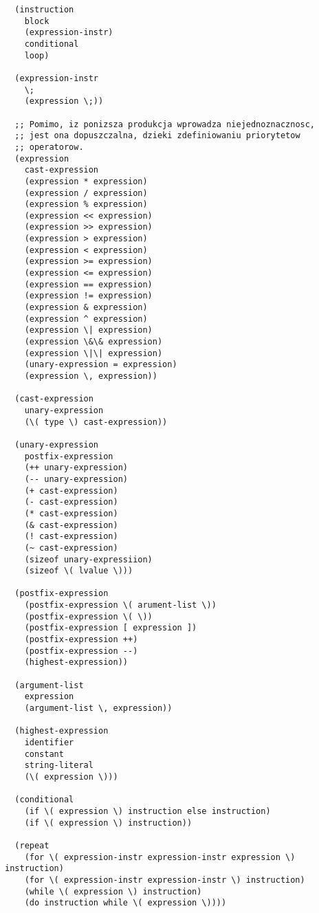\documentclass[11pt,a4paper]{article}
\begin{document}
\begin{lstlisting}
  (instruction
    block
    (expression-instr)
    conditional
    loop)
  
  (expression-instr
    \;
    (expression \;))
  
  ;; Pomimo, iz ponizsza produkcja wprowadza niejednoznacznosc,
  ;; jest ona dopuszczalna, dzieki zdefiniowaniu priorytetow
  ;; operatorow.
  (expression
    cast-expression
    (expression * expression)
    (expression / expression)
    (expression % expression)
    (expression << expression)
    (expression >> expression)
    (expression > expression)
    (expression < expression)
    (expression >= expression)
    (expression <= expression)
    (expression == expression)
    (expression != expression)
    (expression & expression)
    (expression ^ expression)
    (expression \| expression)
    (expression \&\& expression)
    (expression \|\| expression)
    (unary-expression = expression)
    (expression \, expression))
  
  (cast-expression
    unary-expression
    (\( type \) cast-expression))
  
  (unary-expression
    postfix-expression
    (++ unary-expression)
    (-- unary-expression)
    (+ cast-expression)
    (- cast-expression)
    (* cast-expression)
    (& cast-expression)
    (! cast-expression)
    (~ cast-expression)
    (sizeof unary-expressiion)
    (sizeof \( lvalue \)))
  
  (postfix-expression
    (postfix-expression \( arument-list \))
    (postfix-expression \( \))
    (postfix-expression [ expression ])
    (postfix-expression ++)
    (postfix-expression --)
    (highest-expression))
    
  (argument-list
    expression
    (argument-list \, expression))
  
  (highest-expression
    identifier
    constant
    string-literal
    (\( expression \)))
    
  (conditional
    (if \( expression \) instruction else instruction)
    (if \( expression \) instruction))
    
  (repeat
    (for \( expression-instr expression-instr expression \) instruction)
    (for \( expression-instr expression-instr \) instruction)
    (while \( expression \) instruction)
    (do instruction while \( expression \))))

\end{lstlisting}
\end{document}
